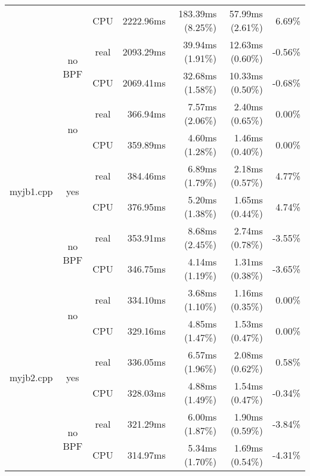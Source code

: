 \documentclass[en]{pracamgr}
\begin{document}
\begin{appendices}
\begin{small}
\begin{longtable}{|l|c|c|r|r|r|r|}
                            &                         & CPU  & 2222.96ms & 183.39ms (8.25\%) & 57.99ms (2.61\%) & 6.69\% \\*
                            \cline{2-7}
                            & \multirow{2}{*}{no BPF} & real & 2093.29ms & 39.94ms (1.91\%) & 12.63ms (0.60\%) & -0.56\% \\*
                            &                         & CPU  & 2069.41ms & 32.68ms (1.58\%) & 10.33ms (0.50\%) & -0.68\% \\
\hline
\multirow{6}{*}{myjb1.cpp}  & \multirow{2}{*}{no}     & real & 366.94ms & 7.57ms (2.06\%) & 2.40ms (0.65\%) & 0.00\% \\*
                            &                         & CPU  & 359.89ms & 4.60ms (1.28\%) & 1.46ms (0.40\%) & 0.00\% \\*
                            \cline{2-7}
                            & \multirow{2}{*}{yes}    & real & 384.46ms & 6.89ms (1.79\%) & 2.18ms (0.57\%) & 4.77\% \\*
                            &                         & CPU  & 376.95ms & 5.20ms (1.38\%) & 1.65ms (0.44\%) & 4.74\% \\*
                            \cline{2-7}
                            & \multirow{2}{*}{no BPF} & real & 353.91ms & 8.68ms (2.45\%) & 2.74ms (0.78\%) & -3.55\% \\*
                            &                         & CPU  & 346.75ms & 4.14ms (1.19\%) & 1.31ms (0.38\%) & -3.65\% \\
\hline
\multirow{6}{*}{myjb2.cpp}  & \multirow{2}{*}{no}     & real & 334.10ms & 3.68ms (1.10\%) & 1.16ms (0.35\%) & 0.00\% \\*
                            &                         & CPU  & 329.16ms & 4.85ms (1.47\%) & 1.53ms (0.47\%) & 0.00\% \\*
                            \cline{2-7}
                            & \multirow{2}{*}{yes}    & real & 336.05ms & 6.57ms (1.96\%) & 2.08ms (0.62\%) & 0.58\% \\*
                            &                         & CPU  & 328.03ms & 4.88ms (1.49\%) & 1.54ms (0.47\%) & -0.34\% \\*
                            \cline{2-7}
                            & \multirow{2}{*}{no BPF} & real & 321.29ms & 6.00ms (1.87\%) & 1.90ms (0.59\%) & -3.84\% \\*
                            &                         & CPU  & 314.97ms & 5.34ms (1.70\%) & 1.69ms (0.54\%) & -4.31\% \\

\end{longtable}
\end{small}
\end{appendices}
\end{document}
